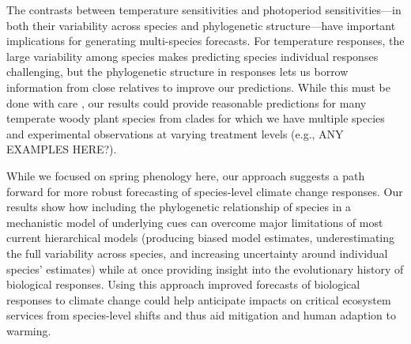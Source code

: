 \documentclass[11pt]{article}
\begin{document}
The contrasts between temperature sensitivities and photoperiod sensitivities---in both their variability across species and phylogenetic structure---have important implications for generating multi-species forecasts. For temperature responses, the large variability among species makes predicting species individual responses challenging, but the phylogenetic structure in responses lets us borrow information from close relatives to improve our predictions. While this must be done with care \citep{molina2018assessing}, our results could provide reasonable predictions for many temperate woody plant species from clades for which we have multiple species and experimental observations at varying treatment levels (e.g., ANY EXAMPLES HERE?). 

While we focused on spring phenology here, our approach suggests a path forward for more robust forecasting of species-level climate change responses. Our results show how including the phylogenetic relationship of species in a mechanistic model of underlying cues can overcome major limitations of most current hierarchical models (producing biased model estimates, underestimating the full variability across species, and increasing uncertainty around individual species' estimates) while at once providing insight into the evolutionary history of biological responses. Using this approach improved forecasts of biological responses to climate change could help anticipate impacts on critical ecosystem services from species-level shifts and thus aid mitigation and human adaption to warming. 


\end{document}
